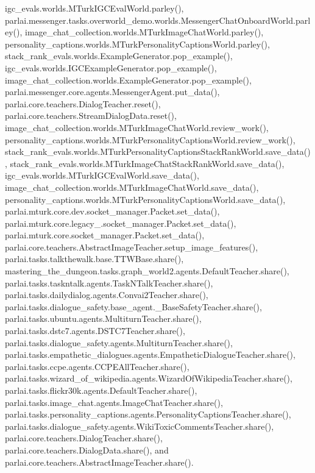 igc\+\_\+evals.\+worlds.\+M\+Turk\+I\+G\+C\+Eval\+World.\+parley(), parlai.\+messenger.\+tasks.\+overworld\+\_\+demo.\+worlds.\+Messenger\+Chat\+Onboard\+World.\+parley(), image\+\_\+chat\+\_\+collection.\+worlds.\+M\+Turk\+Image\+Chat\+World.\+parley(), personality\+\_\+captions.\+worlds.\+M\+Turk\+Personality\+Captions\+World.\+parley(), stack\+\_\+rank\+\_\+evals.\+worlds.\+Example\+Generator.\+pop\+\_\+example(), igc\+\_\+evals.\+worlds.\+I\+G\+C\+Example\+Generator.\+pop\+\_\+example(), image\+\_\+chat\+\_\+collection.\+worlds.\+Example\+Generator.\+pop\+\_\+example(), parlai.\+messenger.\+core.\+agents.\+Messenger\+Agent.\+put\+\_\+data(), parlai.\+core.\+teachers.\+Dialog\+Teacher.\+reset(), parlai.\+core.\+teachers.\+Stream\+Dialog\+Data.\+reset(), image\+\_\+chat\+\_\+collection.\+worlds.\+M\+Turk\+Image\+Chat\+World.\+review\+\_\+work(), personality\+\_\+captions.\+worlds.\+M\+Turk\+Personality\+Captions\+World.\+review\+\_\+work(), stack\+\_\+rank\+\_\+evals.\+worlds.\+M\+Turk\+Personality\+Captions\+Stack\+Rank\+World.\+save\+\_\+data(), stack\+\_\+rank\+\_\+evals.\+worlds.\+M\+Turk\+Image\+Chat\+Stack\+Rank\+World.\+save\+\_\+data(), igc\+\_\+evals.\+worlds.\+M\+Turk\+I\+G\+C\+Eval\+World.\+save\+\_\+data(), image\+\_\+chat\+\_\+collection.\+worlds.\+M\+Turk\+Image\+Chat\+World.\+save\+\_\+data(), personality\+\_\+captions.\+worlds.\+M\+Turk\+Personality\+Captions\+World.\+save\+\_\+data(), parlai.\+mturk.\+core.\+dev.\+socket\+\_\+manager.\+Packet.\+set\+\_\+data(), parlai.\+mturk.\+core.\+legacy\+\_.\+socket\+\_\+manager.\+Packet.\+set\+\_\+data(), parlai.\+mturk.\+core.\+socket\+\_\+manager.\+Packet.\+set\+\_\+data(), parlai.\+core.\+teachers.\+Abstract\+Image\+Teacher.\+setup\+\_\+image\+\_\+features(), parlai.\+tasks.\+talkthewalk.\+base.\+T\+T\+W\+Base.\+share(), mastering\+\_\+the\+\_\+dungeon.\+tasks.\+graph\+\_\+world2.\+agents.\+Default\+Teacher.\+share(), parlai.\+tasks.\+taskntalk.\+agents.\+Task\+N\+Talk\+Teacher.\+share(), parlai.\+tasks.\+dailydialog.\+agents.\+Convai2\+Teacher.\+share(), parlai.\+tasks.\+dialogue\+\_\+safety.\+base\+\_\+agent.\+\_\+\+Base\+Safety\+Teacher.\+share(), parlai.\+tasks.\+ubuntu.\+agents.\+Multiturn\+Teacher.\+share(), parlai.\+tasks.\+dstc7.\+agents.\+D\+S\+T\+C7\+Teacher.\+share(), parlai.\+tasks.\+dialogue\+\_\+safety.\+agents.\+Multiturn\+Teacher.\+share(), parlai.\+tasks.\+empathetic\+\_\+dialogues.\+agents.\+Empathetic\+Dialogue\+Teacher.\+share(), parlai.\+tasks.\+ccpe.\+agents.\+C\+C\+P\+E\+All\+Teacher.\+share(), parlai.\+tasks.\+wizard\+\_\+of\+\_\+wikipedia.\+agents.\+Wizard\+Of\+Wikipedia\+Teacher.\+share(), parlai.\+tasks.\+flickr30k.\+agents.\+Default\+Teacher.\+share(), parlai.\+tasks.\+image\+\_\+chat.\+agents.\+Image\+Chat\+Teacher.\+share(), parlai.\+tasks.\+personality\+\_\+captions.\+agents.\+Personality\+Captions\+Teacher.\+share(), parlai.\+tasks.\+dialogue\+\_\+safety.\+agents.\+Wiki\+Toxic\+Comments\+Teacher.\+share(), parlai.\+core.\+teachers.\+Dialog\+Teacher.\+share(), parlai.\+core.\+teachers.\+Dialog\+Data.\+share(), and parlai.\+core.\+teachers.\+Abstract\+Image\+Teacher.\+share().

